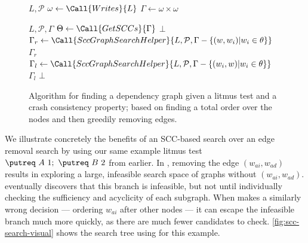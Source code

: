 \begin{figure}[h]
\begin{algorithmic}[1]
    {$L, \mathcal{P}$} 
    \State $\omega \gets \Call{Writes}{L}$ 
    \State $\Gamma \gets \omega \times \omega$ 
    \State \Return {}
  \EndFunction

    {$L, \mathcal{P}, \Gamma$} 
    \State $\Theta \gets \Call{GetSCCs}{\Gamma}$
      \State \Return {}
    \EndIf
      \State \Return $\bot$
    \EndIf
    \For{$\theta\in\Theta$}
        \State $\Gamma_r \gets \Call{SccGraphSearchHelper}{L, \mathcal{P}, \Gamma - \{(w, w_i) | w_i \in \theta\}}$
          \State \Return $\Gamma_r$
        \EndIf
        \State $\Gamma_l \gets \Call{SccGraphSearchHelper}{L, \mathcal{P}, \Gamma - \{(w_i, w) | w_i \in \theta\}}$
          \State \Return $\Gamma_l$
        \EndIf
      \EndFor
    \EndFor
    \State \Return $\bot$ 
  \EndFunction
\end{algorithmic}
\caption{Algorithm for finding a dependency graph given a litmus test and a crash consistency
property; based on finding a total order over the nodes and then greedily removing edges.\tighten}
\label{alg:scc-search}
\end{figure}

We illustrate concretely the benefits of an SCC-based search
over an edge removal search by using our same example
litmus test $ \putreq\ A\ 1;\ \putreq\ B\ 2$ from earlier.
In \graphsearch, removing the edge $(w_{ai},w_{ad})$
results in exploring a large, infeasible search space
of graphs without $(w_{ai},w_{ad})$.
\graphsearch eventually discovers that this branch is infeasible,
but not until individually checking the sufficiency and acyclicity
of each subgraph.
When \sccsearch makes a similarly wrong decision --- ordering $w_{ai}$
after other nodes --- it can escape the infeasible branch much more quickly,
as there are much fewer candidates to check.
\autoref{fig:scc-search-visual} shows the search tree using \sccsearch for this example.

